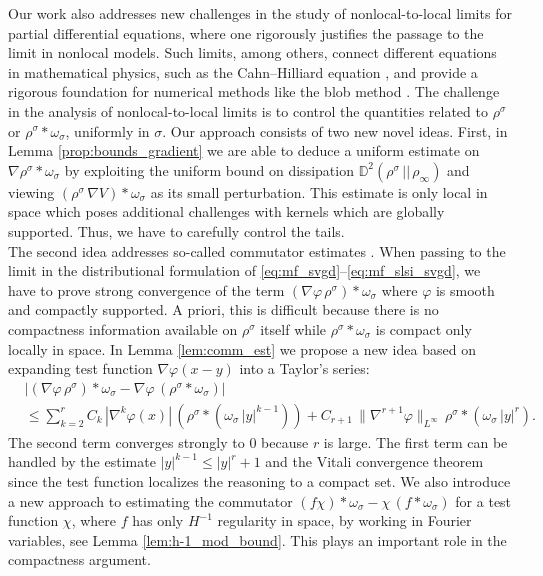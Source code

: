 \documentclass[reqno, 11pt]{amsart}
\numberwithin{equation}{section}
\theoremstyle{definition}
\begin{document}
    Our work also addresses new challenges in the study of nonlocal-to-local limits for partial differential equations, where one rigorously justifies the passage to the limit in nonlocal models. Such limits, among others, connect different equations in mathematical physics, such as the Cahn–Hilliard equation \cite{davoli_scarpa_trussardi_2021_nonlocal,elbar_skrzeczkowski_2023_degenerate}, and provide a rigorous foundation for numerical methods like the blob method \cite{carrillo_craig_patacchini_2019_blob,carrillo_esposito_skrzeczkowski_wu_2024_nonlocal,craig_jacobs_turanova_2025_nonlocal}. The challenge in the analysis of nonlocal-to-local limits is to control the quantities related to $\rho^\sigma$ or $\rho^\sigma\ast\omega_\sigma$, uniformly in $\sigma$. Our approach consists of two new novel ideas. First, in Lemma \ref{prop:bounds_gradient} we are able to deduce a uniform estimate on $\nabla \rho^\sigma \ast \omega_\sigma$ by exploiting the uniform bound on dissipation $\mathbb{D}^2(\rho^\sigma\, ||\, \rho_\infty)$ and viewing $(\rho^\sigma\, \nabla V)\ast \omega_\sigma$ as its small perturbation. This estimate is only local in space which poses additional challenges with kernels which are globally supported. Thus, we have to carefully control the tails.\\

    The second idea addresses so-called commutator estimates \cite{constantin_e_titi_1994_onsager,diperna_lions_1989_ordinary,elbar_perthame_skrzeczkowski_2024_limit}. When passing to the limit in the distributional formulation of \eqref{eq:mf_svgd}--\eqref{eq:mf_slsi_svgd}, we have to prove strong convergence of the term $(\nabla \varphi \,  \rho^\sigma)\ast \omega_\sigma$ where $\varphi$ is smooth and compactly supported. A priori, this is difficult because there is no compactness information available on $\rho^\sigma$ itself while $\rho^\sigma\ast\omega_\sigma$ is compact only locally in space. In Lemma \ref{lem:comm_est} we propose a new idea based on expanding test function $\nabla \varphi(x-y)$ into a Taylor's series:
    \begin{align*}
        &|(\nabla \varphi \,  \rho^\sigma)\ast \omega_\sigma - \nabla \varphi \, (\rho^\sigma\ast \omega_\sigma)|\\ &\leq \sum_{k=2}^{r} C_k\, |\nabla^k \varphi(x)|\, (\rho^\sigma\ast(\omega_\sigma\, |y|^{k-1}))+ C_{r+1} \, \|\nabla^{r+1} \varphi\|_{L^{\infty}} \, \rho^\sigma\ast(\omega_\sigma\, |y|^{r}).
    \end{align*}
    The second term converges strongly to 0 because $r$ is large. The first term can be handled by the estimate $|y|^{k-1}\leq |y|^r + 1$ and the Vitali convergence theorem since the test function localizes the reasoning to a compact set. We also introduce a new approach to estimating the commutator $(f\chi)\ast\omega_\sigma-\chi\,(f\ast\omega_\sigma)$ for a test function $\chi$, where $f$ has only $H^{-1}$ regularity in space, by working in Fourier variables, see Lemma \ref{lem:h-1_mod_bound}. This plays an important role in the compactness argument.  \\
\end{document}
